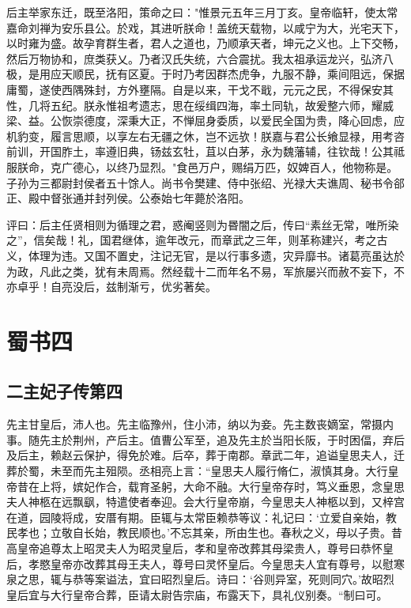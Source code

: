 \documentclass[12pt,UTF8]{ctexbook}
\begin{document}
后主举家东迁，既至洛阳，策命之曰："惟景元五年三月丁亥。皇帝临轩，使太常嘉命刘禅为安乐县公。於戏，其进听朕命！盖统天载物，以咸宁为大，光宅天下，以时雍为盛。故孕育群生者，君人之道也，乃顺承天者，坤元之义也。上下交畅，然后万物协和，庶类获乂。乃者汉氏失统，六合震扰。我太祖承运龙兴，弘济八极，是用应天顺民，抚有区夏。于时乃考因群杰虎争，九服不静，乘间阻远，保据庸蜀，遂使西隅殊封，方外壅隔。自是以来，干戈不戢，元元之民，不得保安其性，几将五纪。朕永惟祖考遗志，思在绥缉四海，率土同轨，故爰整六师，耀威梁、益。公恢崇德度，深秉大正，不惮屈身委质，以爱民全国为贵，降心回虑，应机豹变，履言思顺，以享左右无疆之休，岂不远欤！朕嘉与君公长飨显禄，用考咨前训，开国胙土，率遵旧典，钖兹玄牡，苴以白茅，永为魏藩辅，往钦哉！公其祗服朕命，克广德心，以终乃显烈。"食邑万户，赐绢万匹，奴婢百人，他物称是。子孙为三都尉封侯者五十馀人。尚书令樊建、侍中张绍、光禄大夫谯周、秘书令郤正、殿中督张通并封列侯。公泰始七年薨於洛阳。

评曰：后主任贤相则为循理之君，惑阉竖则为昬闇之后，传曰“素丝无常，唯所染之”，信矣哉！礼，国君继体，逾年改元，而章武之三年，则革称建兴，考之古义，体理为违。又国不置史，注记无官，是以行事多遗，灾异靡书。诸葛亮虽达於为政，凡此之类，犹有未周焉。然经载十二而年名不易，军旅屡兴而赦不妄下，不亦卓乎！自亮没后，兹制渐亏，优劣著矣。

\part{蜀书四}
\chapter{二主妃子传第四}

先主甘皇后，沛人也。先主临豫州，住小沛，纳以为妾。先主数丧嫡室，常摄内事。随先主於荆州，产后主。值曹公军至，追及先主於当阳长阪，于时困偪，弃后及后主，赖赵云保护，得免於难。后卒，葬于南郡。章武二年，追谥皇思夫人，迁葬於蜀，未至而先主殂陨。丞相亮上言：“皇思夫人履行脩仁，淑慎其身。大行皇帝昔在上将，嫔妃作合，载育圣躬，大命不融。大行皇帝存时，笃义垂恩，念皇思夫人神柩在远飘飖，特遣使者奉迎。会大行皇帝崩，今皇思夫人神柩以到，又梓宫在道，园陵将成，安厝有期。臣辄与太常臣赖恭等议：礼记曰：‘立爱自亲始，教民孝也；立敬自长始，教民顺也。’不忘其亲，所由生也。春秋之义，母以子贵。昔高皇帝追尊太上昭灵夫人为昭灵皇后，孝和皇帝改葬其母梁贵人，尊号曰恭怀皇后，孝愍皇帝亦改葬其母王夫人，尊号曰灵怀皇后。今皇思夫人宜有尊号，以慰寒泉之思，辄与恭等案谥法，宜曰昭烈皇后。诗曰：‘谷则异室，死则同穴。’故昭烈皇后宜与大行皇帝合葬，臣请太尉告宗庙，布露天下，具礼仪别奏。“制曰可。
\end{document}

